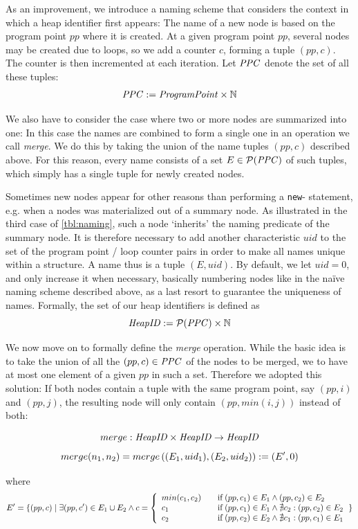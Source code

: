 \documentclass[11pt,a4paper,english]{article}
\begin{document}
As an improvement, we introduce a naming scheme that considers the context in
which a heap identifier first appears: The name of a new node is based on the
program point $pp$ where it is created. At a given program point $pp$, several
nodes may be created due to loops, so we add a counter $c$, forming a tuple
$(pp,c)$. The counter is then incremented at each iteration. Let $\mathit{PPC}$ denote
the set of all these tuples:
\[
\mathit{PPC} := \mathit{ProgramPoint} \times \mathbb{N}
\]

We also have to consider the case where two or more nodes are summarized into
one: In this case the names are combined to form a single one in an operation we
call \textit{merge}. We do this by taking the union of the name tuples $(pp,c)$
described above. For this reason, every name consists of a set $E \in
\mathcal{P}(\mathit{PPC})$ of such tuples, which simply has a single tuple for newly
created nodes. 

Sometimes new nodes appear for other reasons than performing a \texttt{new}-
statement, e.g. when a nodes was materialized out of a summary node.  As
illustrated in the third case of \autoref{tbl:naming}, such a node `inherits'
the naming predicate of the summary node. It is therefore necessary to add
another characteristic $uid$ to the set of the program point / loop counter
pairs in order to make all names unique within a structure. A name thus is a
tuple $(E, uid)$. By default, we let $uid = 0$, and only increase it when
necessary, basically numbering nodes like in the naïve naming scheme described
above, as a last resort to guarantee the uniqueness of names. Formally, the set
of our heap identifiers is defined as
\[
\mathit{HeapID} := \mathcal{P}(\mathit{PPC}) \times \mathbb{N}
\]

We now move on to formally define the \textit{merge} operation. While the basic
idea is to take the union of all the $(pp,c) \in \mathit{PPC}$ of the nodes to be
merged, we to have at most one element of a given $pp$ in such a set. Therefore
we adopted this solution:  If both nodes contain a tuple with the same program
point, say $(pp,i)$ and $(pp,j)$, the resulting node will only contain $(pp,
min(i,j))$ instead of both:

\[
merge : \mathit{HeapID} \times \mathit{HeapID} \rightarrow \mathit{HeapID} 
\]
\[
merge(n_1,n_2) = merge\left( (E_1, uid_1), (E_2, uid_2)\right) := (E', 0) \\
\]

where
\[
  E' = \{ (pp,c) \mid \exists (pp,c') \in E_1 \cup E_2 \land c = \left\{
  \begin{array}{l l}
    min(c_1, c_2) & \quad \text{if} \; (pp,c_1) \in E_1 \land (pp,c_2) \in E_2 \\
    c_1 & \quad \text{if} \; (pp,c_1) \in E_1 \land \nexists c_2 : (pp,c_2) \in E_2 \\
    c_2 & \quad \text{if} \; (pp,c_2) \in E_2 \land \nexists c_1 : (pp,c_1) \in E_1 \\
  \end{array} \right. \}
\]
\end{document}
